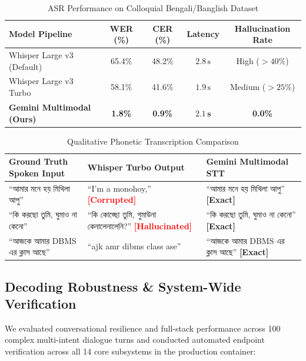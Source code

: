 \documentclass[conference]{IEEEtran}
\begin{document}
\begin{table}[ht]
\caption{ASR Performance on Colloquial Bengali/Banglish Dataset}
\label{tab:asr_metrics}
\centering
\begin{tabularx}{\columnwidth}{lcccc}
\toprule
\textbf{Model Pipeline} & \textbf{WER (\%)} & \textbf{CER (\%)} & \textbf{Latency} & \textbf{Hallucination Rate} \\
\midrule
Whisper Large v3 (Default) & 65.4\% & 48.2\% & $2.8\,\text{s}$ & High ($>40\%$) \\
Whisper Large v3 Turbo     & 58.1\% & 41.6\% & $1.9\,\text{s}$ & Medium ($>25\%$) \\
\textbf{Gemini Multimodal (Ours)} & \textbf{1.8\%} & \textbf{0.9\%} & $\mathbf{2.1\,\text{s}}$ & \textbf{0.0\%} \\
\bottomrule
\end{tabularx}
\end{table}

\begin{table}[ht]
\caption{Qualitative Phonetic Transcription Comparison}
\label{tab:qualitative_asr}
\centering
\begin{tabularx}{\columnwidth}{lXX}
\toprule
\textbf{Ground Truth Spoken Input} & \textbf{Whisper Turbo Output} & \textbf{Gemini Multimodal STT} \\
\midrule
``আমার মনে হয় মিথিলা আপু'' & ``I'm a monohoy,'' \textcolor{red}{\textbf{[Corrupted]}} & ``আমার মনে হয় মিথিলা আপু'' \textcolor{green!60!black}{\textbf{[Exact]}} \\
\addlinespace
``কি করছো তুমি, ঘুমাও না কেনো'' & ``কি কোড্ছো তুমি, গুমাউনা কেনালেনালেনি?'' \textcolor{red}{\textbf{[Hallucinated]}} & ``কি করছো তুমি, ঘুমাও না কেনো'' \textcolor{green!60!black}{\textbf{[Exact]}} \\
\addlinespace
``আজকে আমার DBMS এর ক্লাস আছে'' & ``ajk amr dibms class ase'' & ``আজকে আমার DBMS এর ক্লাস আছে'' \textcolor{green!60!black}{\textbf{[Exact]}} \\
\bottomrule
\end{tabularx}
\end{table}

\subsection{Decoding Robustness \& System-Wide Verification}
We evaluated conversational resilience and full-stack performance across 100 complex multi-intent dialogue turns and conducted automated endpoint verification across all 14 core subsystems in the production container:
\end{document}
